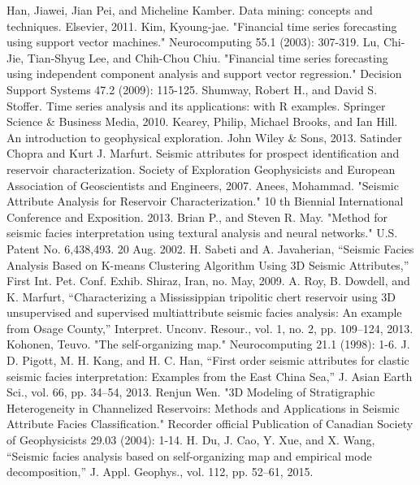 \documentclass[a4paper]{article}
\begin{document}
\begin{thebibliography}{00}
Han, Jiawei, Jian Pei, and Micheline Kamber. Data mining: concepts and techniques. Elsevier, 2011.
Kim, Kyoung-jae. "Financial time series forecasting using support vector machines." Neurocomputing 55.1 (2003): 307-319.
Lu, Chi-Jie, Tian-Shyug Lee, and Chih-Chou Chiu. "Financial time series forecasting using independent component analysis and support vector regression." Decision Support Systems 47.2 (2009): 115-125.
Shumway, Robert H., and David S. Stoffer. Time series analysis and its applications: with R examples. Springer Science \& Business Media, 2010.
Kearey, Philip, Michael Brooks, and Ian Hill. An introduction to geophysical exploration. John Wiley \& Sons, 2013.
Satinder Chopra and Kurt J. Marfurt. Seismic attributes for prospect identification and reservoir characterization. Society of Exploration Geophysicists and European Association of Geoscientists and Engineers, 2007.
Anees, Mohammad. "Seismic Attribute Analysis for Reservoir Characterization." 10 th Biennial International Conference and Exposition. 2013.
Brian P., and Steven R. May. "Method for seismic facies interpretation using textural analysis and neural networks." U.S. Patent No. 6,438,493. 20 Aug. 2002.
H. Sabeti and A. Javaherian, “Seismic Facies Analysis Based on K-means Clustering Algorithm Using 3D Seismic Attributes,” First Int. Pet. Conf. Exhib. Shiraz, Iran, no. May, 2009.
A. Roy, B. Dowdell, and K. Marfurt, “Characterizing a Mississippian tripolitic chert reservoir using 3D unsupervised and supervised multiattribute seismic facies analysis: An example from Osage County,” Interpret. Unconv. Resour., vol. 1, no. 2, pp. 109–124, 2013.
Kohonen, Teuvo. "The self-organizing map." Neurocomputing 21.1 (1998): 1-6.
J. D. Pigott, M. H. Kang, and H. C. Han, “First order seismic attributes for clastic seismic facies interpretation: Examples from the East China Sea,” J. Asian Earth Sci., vol. 66, pp. 34–54, 2013.
Renjun Wen. "3D Modeling of Stratigraphic Heterogeneity in Channelized Reservoirs: Methods and Applications in Seismic Attribute Facies Classification." Recorder official Publication of Canadian Society of Geophysicists 29.03 (2004): 1-14.
H. Du, J. Cao, Y. Xue, and X. Wang, “Seismic facies analysis based on self-organizing map and empirical mode decomposition,” J. Appl. Geophys., vol. 112, pp. 52–61, 2015.

\end{thebibliography}
\end{document}

